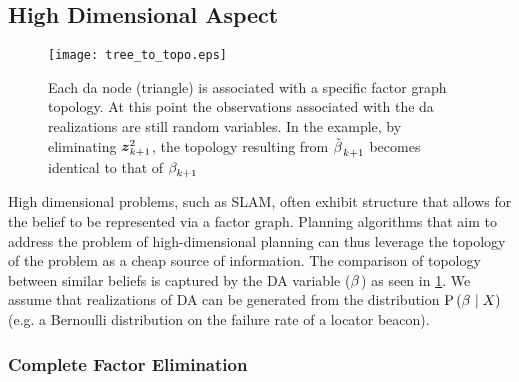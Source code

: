 \subsection{High Dimensional Aspect}\label{sec:high_dim}

\begin{figure}[h]
	\centering
	\texttt{[image: tree\_to\_topo.eps]}
	\caption{Each da node (triangle) is associated with a specific factor graph topology. At this point the observations associated with the da realizations are still random variables. In the example, by eliminating $\boldsymbol z_{k+1}^{2}$, the topology resulting from $\tilde{\beta_{}^{}}_{k+1}$ becomes identical to that of $\beta_{k+1}^{}$}
	\label{fig:topology}
\end{figure}
High dimensional problems, such as SLAM, often exhibit structure that allows for the belief to be represented via a factor graph. Planning algorithms that aim to address the problem of high-dimensional planning can thus leverage the topology of the problem as a cheap source of information. The comparison of topology between similar beliefs is captured by the DA variable ($\beta_{}^{}$) as seen in \cref{fig:topology}. We assume that realizations of DA can be generated from the distribution $\mathrm{P}\left({\beta_{}^{}}\mid{\ensuremath{X_{}}}\right)$ (e.g. a Bernoulli distribution on the failure rate of a locator beacon).

\subsubsection{Complete Factor Elimination}

